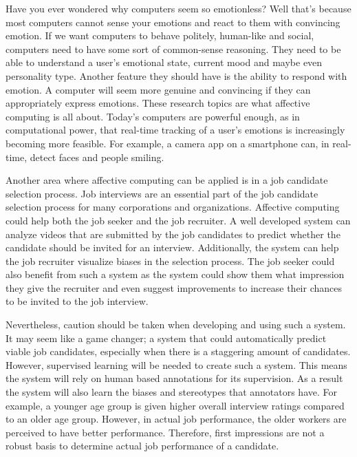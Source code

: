 Have you ever wondered why computers seem so emotionless? Well that's because most computers cannot sense your emotions and react to them with convincing emotion. If we want computers to behave politely, human-like and social, computers need to have some sort of common-sense reasoning. They need to be able to understand a user's emotional state, current mood and maybe even personality type. Another feature they should have is the ability to respond with emotion. A computer will seem more genuine and convincing if they can appropriately express emotions. These research topics are what affective computing is all about. Today's computers are powerful enough, as in computational power, that real-time tracking of a user's emotions is increasingly becoming more feasible. For example, a camera app on a smartphone can, in real-time, detect faces and people smiling. 

Another area where affective computing can be applied is in a job candidate selection process. Job interviews are an essential part of the job candidate selection process for many corporations and organizations. Affective computing could help both the job seeker and the job recruiter. A well developed system can analyze videos that are submitted by the job candidates to predict whether the candidate should be invited for an interview. Additionally, the system can help the job recruiter visualize biases in the selection process. The job seeker could also benefit from such a system as the system could show them what impression they give the recruiter and even suggest improvements to increase their chances to be invited to the job interview. 

Nevertheless, caution should be taken when developing and using such a system. It may seem like a game changer; a system that could automatically predict viable job candidates, especially when there is a staggering amount of candidates. However, supervised learning will be needed to create such a system. This means the system will rely on human based annotations for its supervision. As a result the system will also learn the biases and stereotypes that annotators have. For example, a younger age group is given higher overall interview ratings compared to an older age group. However, in actual job performance, the older workers are perceived to have better performance. Therefore, first impressions are not a robust basis to determine actual job performance of a candidate.